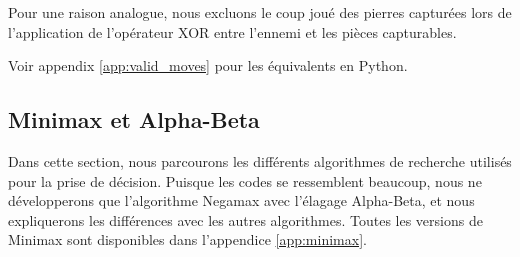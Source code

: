 Pour une raison analogue, nous excluons le coup joué des pierres capturées lors de l'application de l'opérateur XOR entre l'ennemi et les pièces capturables.

Voir appendix \ref{app:valid_moves} pour les équivalents en Python.

\subsection{Minimax et Alpha-Beta}
\label{subsec:minimax}
Dans cette section, nous parcourons les différents algorithmes de recherche utilisés pour la prise de décision. Puisque les codes se ressemblent beaucoup, nous ne développerons que l'algorithme Negamax avec l'élagage Alpha-Beta, et nous expliquerons les différences avec les autres algorithmes. Toutes les versions de Minimax sont disponibles dans l'appendice \ref{app:minimax}.